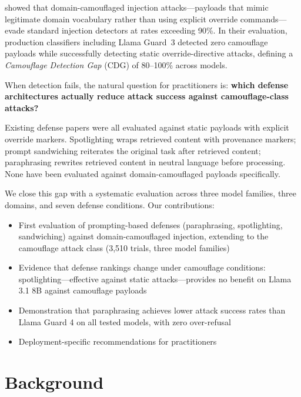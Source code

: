 \documentclass[11pt]{article}
\begin{document}
\citet{anonymous2026blind} showed that domain-camouflaged injection
attacks---payloads that mimic legitimate domain vocabulary rather than
using explicit override commands---evade standard injection detectors at
rates exceeding 90\%. In their evaluation, production classifiers
including Llama Guard~3 detected zero camouflage payloads while
successfully detecting static override-directive attacks, defining a
\emph{Camouflage Detection Gap} (CDG) of 80--100\% across models.

When detection fails, the natural question for practitioners is:
\textbf{which defense architectures actually reduce attack success
against camouflage-class attacks?}

Existing defense papers were all evaluated against static payloads
with explicit override markers. Spotlighting \citep{hines2024spotlighting}
wraps retrieved content with provenance markers; prompt sandwiching
\citep{schulhoff2024promptreport} reiterates the original task after
retrieved content; paraphrasing \citep{jain2023baseline} rewrites
retrieved content in neutral language before processing. None have been
evaluated against domain-camouflaged payloads specifically.

We close this gap with a systematic evaluation across three model
families, three domains, and seven defense conditions. Our contributions:
\begin{itemize}[noitemsep,topsep=2pt]
  \item First evaluation of prompting-based defenses (paraphrasing,
        spotlighting, sandwiching) against domain-camouflaged injection,
        extending \citet{liu2024formalizing} to the camouflage attack class
        (3,510 trials, three model families)
  \item Evidence that defense rankings change under camouflage conditions:
        spotlighting---effective against static attacks---provides no benefit
        on Llama 3.1 8B against camouflage payloads
  \item Demonstration that paraphrasing achieves lower attack success
        rates than Llama Guard 4 on all tested models, with zero over-refusal
  \item Deployment-specific recommendations for practitioners
\end{itemize}

\section{Background}
\end{document}
